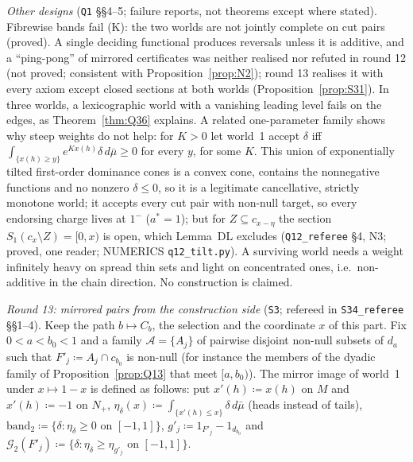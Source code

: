 \documentclass[11pt]{article}
\theoremstyle{definition}
\theoremstyle{remark}
\newcommand{\src}[1]{\texttt{#1}}
\begin{document}
\emph{Other designs} (\src{Q1} \S\S4--5; failure reports, not theorems except where stated). Fibrewise bands fail (K): the two worlds are not jointly complete on cut pairs (proved). A single deciding functional produces reversals unless it is additive, and a ``ping-pong'' of mirrored certificates was neither realised nor refuted in round 12 (not proved; consistent with Proposition~\ref{prop:N2}); round 13 realises it with every axiom except closed sections at both worlds (Proposition~\ref{prop:S31}). In three worlds, a lexicographic world with a vanishing leading level fails on the edges, as Theorem~\ref{thm:Q36} explains. A related one-parameter family shows why steep weights do not help: for $K>0$ let world~1 accept $\delta$ iff $\int_{\{x(h)\ge y\}}e^{Kx(h)}\delta\,d\bar\mu\ge0$ for every $y$, for some $K$. This union of exponentially tilted first-order dominance cones is a convex cone, contains the nonnegative functions and no nonzero $\delta\le0$, so it is a legitimate cancellative, strictly monotone world; it accepts every cut pair with non-null target, so every endorsing charge lives at $1^-$ ($a^*=1$); but for $Z\subseteq c_{x-\eta}$ the section $S_1(c_x\setminus Z)=[0,x)$ is open, which Lemma~DL excludes (\src{Q12\_referee} \S4, N3; proved, one reader; NUMERICS \src{q12\_tilt.py}). A surviving world needs a weight infinitely heavy on spread thin sets and light on concentrated ones, i.e.\ non-additive in the chain direction. No construction is claimed.

\emph{Round 13: mirrored pairs from the construction side} (\src{S3}; refereed in \src{S34\_referee} \S\S1--4). Keep the path $b\mapsto C_b$, the selection and the coordinate $x$ of this part. Fix $0<a<b_0<1$ and a family $\mathcal A=\{A_j\}$ of pairwise disjoint non-null subsets of $d_a$ such that $F'_j\coloneqq A_j\cap c_{b_0}$ is non-null (for instance the members of the dyadic family of Proposition~\ref{prop:Q13} that meet $[a,b_0)$). The mirror image of world~1 under $x\mapsto1-x$ is defined as follows: put $x'(h)\coloneqq x(h)$ on $M$ and $x'(h)\coloneqq-1$ on $N_+$, $\eta_\delta(x)\coloneqq\int_{\{x'(h)\le x\}}\delta\,d\bar\mu$ (heads instead of tails), $\mathrm{band}_2\coloneqq\{\delta:\eta_\delta\ge0\text{ on }[-1,1]\}$, $g'_j\coloneqq1_{F'_j}-1_{d_{b_0}}$ and $\mathcal G_2(F'_j)\coloneqq\{\delta:\eta_\delta\ge\eta_{g'_j}\text{ on }[-1,1]\}$.
\end{document}
